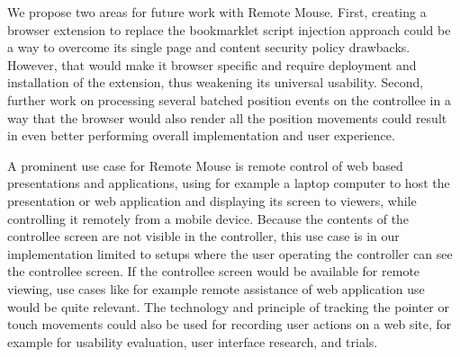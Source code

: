 \documentclass[a4paper,english,twocolumn]{article}
\begin{document}
We propose two areas for future work with Remote Mouse. First,
creating a browser extension to replace the bookmarklet script
injection approach could be a way to overcome its single page and
content security policy drawbacks. However, that would make it browser
specific and require deployment and installation of the extension,
thus weakening its universal usability. Second, further work on
processing several batched position events on the controllee in a way
that the browser would also render all the position movements could
result in even better performing overall implementation and user
experience.

A prominent use case for Remote Mouse is remote control of web based
presentations and applications, using for example a laptop computer to
host the presentation or web application and displaying its screen to
viewers, while controlling it remotely from a mobile device. Because
the contents of the controllee screen are not visible in the
controller, this use case is in our implementation limited to setups
where the user operating the controller can see the controllee
screen. If the controllee screen would be available for remote
viewing, use cases like for example remote assistance of web
application use would be quite relevant. The technology and principle
of tracking the pointer or touch movements could also be used for
recording user actions on a web site, for example for usability
evaluation, user interface research, and trials.






\end{document}
